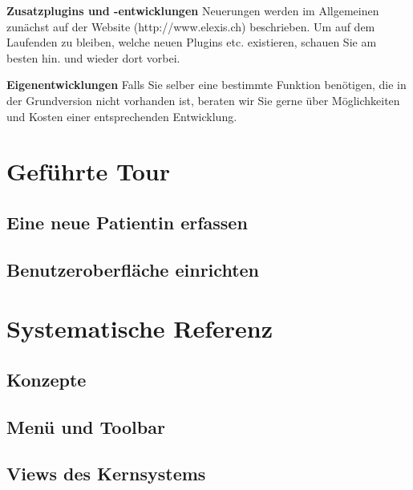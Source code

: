 \documentclass[paper=a4,BCOR8.25mm,twoside]{scrbook}
\begin{document}
\bigskip

\textbf{Zusatzplugins und -entwicklungen}
Neuerungen werden im Allgemeinen zunächst auf der Website (http://www.elexis.ch) beschrieben. Um auf dem Laufenden zu bleiben, welche neuen Plugins etc. existieren, schauen Sie am besten hin. und wieder dort vorbei.

\bigskip
{}
\textbf{Eigenentwicklungen}
Falls Sie selber eine bestimmte Funktion benötigen, die in der Grundversion nicht vorhanden ist, beraten wir Sie gerne über Möglichkeiten und Kosten einer entsprechenden Entwicklung.





\part{Geführte Tour}
\chapter{Eine neue Patientin erfassen}
\label{tour}
	
\chapter{Benutzeroberfläche einrichten}
	\label{customize}
	

\part{Systematische Referenz}
\chapter{Konzepte}
	
\chapter{Menü und Toolbar} 					
	
\chapter{Views des Kernsystems}
	
	
	
	
	
	
	
\end{document}
